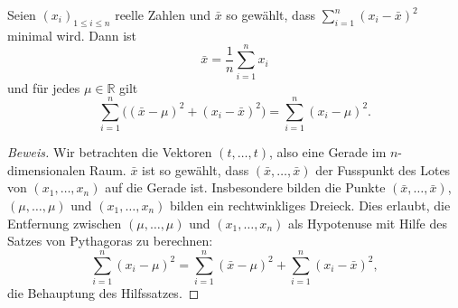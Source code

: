 \begin{hilfssatz}
\label{hilfssatz-varianz-mittelwert}
Seien $(x_i)_{1\le i\le n}$ reelle Zahlen und $\bar x$ so gewählt,
dass $\sum_{i=1}^n(x_i-\bar x)^2$ minimal wird.
Dann ist 
\begin{equation}
\bar x=\frac1n\sum_{i=1}^nx_i
\end{equation}
und für jedes $\mu\in\mathbb{R}$ gilt
\begin{equation}
\sum_{i=1}^n\bigl((\bar x-\mu)^2 + (x_i-\bar x)^2\bigr)
=\sum_{i=1}^n(x_i-\mu)^2.
\end{equation}
\end{hilfssatz}
\begin{proof}[Beweis]
Wir betrachten die Vektoren $(t,\dots,t)$, also eine Gerade im
$n$-dimensionalen Raum.
$\bar x$ ist so gewählt, dass $(\bar x,\dots,\bar x)$
der Fusspunkt des Lotes von $(x_1,\dots,x_n)$ auf die Gerade ist.
Insbesondere bilden die Punkte $(\bar x,\dots,\bar x)$, $(\mu,\dots,\mu)$
und $(x_1,\dots,x_n)$ bilden ein rechtwinkliges Dreieck.
Dies erlaubt,
die Entfernung zwischen $(\mu,\dots,\mu)$ und $(x_1,\dots,x_n)$ 
als Hypotenuse mit Hilfe des Satzes von Pythagoras zu berechnen:
\[
\sum_{i=1}^n(x_i-\mu)^2
=\sum_{i=1}^n(\bar x-\mu)^2+\sum_{i=1}^n(x_i-\bar x)^2,
\]
die Behauptung des Hilfssatzes.
\end{proof}

